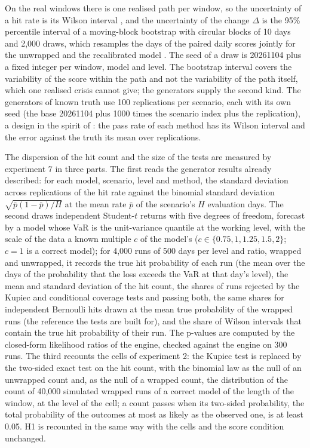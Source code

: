 On the real windows there is one realised path per window, so the uncertainty of a hit rate is its Wilson interval \citep{brown2001,wilson1927}, and the uncertainty of the change $\Delta$ is the 95\% percentile interval of a moving-block bootstrap with circular blocks of 10 days and 2,000 draws, which resamples the days of the paired daily scores jointly for the unwrapped and the recalibrated model \citep{kunsch1989,politis1994}. The seed of a draw is 20261104 plus a fixed integer per window, model and level. The bootstrap interval covers the variability of the score within the path and not the variability of the path itself, which one realised crisis cannot give; the generators supply the second kind. The generators of known truth use 100 replications per scenario, each with its own seed (the base 20261104 plus 1000 times the scenario index plus the replication), a design in the spirit of \citet{morris2019}: the pass rate of each method has its Wilson interval and the error against the truth its mean over replications.

The dispersion of the hit count and the size of the tests are measured by experiment 7 in three parts. The first reads the generator results already described: for each model, scenario, level and method, the standard deviation across replications of the hit rate against the binomial standard deviation $\sqrt{\bar p(1-\bar p)/H}$ at the mean rate $\bar p$ of the scenario's $H$ evaluation days. The second draws independent Student-$t$ returns with five degrees of freedom, forecast by a model whose VaR is the unit-variance quantile at the working level, with the scale of the data a known multiple $c$ of the model's ($c \in \{0.75, 1, 1.25, 1.5, 2\}$; $c = 1$ is a correct model); for 4,000 runs of 500 days per level and ratio, wrapped and unwrapped, it records the true hit probability of each run (the mean over the days of the probability that the loss exceeds the VaR at that day's level), the mean and standard deviation of the hit count, the shares of runs rejected by the Kupiec and conditional coverage tests and passing both, the same shares for independent Bernoulli hits drawn at the mean true probability of the wrapped runs (the reference the tests are built for), and the share of Wilson intervals that contain the true hit probability of their run. The p-values are computed by the closed-form likelihood ratios of the engine, checked against the engine on 300 runs. The third recounts the cells of experiment 2: the Kupiec test is replaced by the two-sided exact test on the hit count, with the binomial law as the null of an unwrapped count and, as the null of a wrapped count, the distribution of the count of 40,000 simulated wrapped runs of a correct model of the length of the window, at the level of the cell; a count passes when its two-sided probability, the total probability of the outcomes at most as likely as the observed one, is at least 0.05. H1 is recounted in the same way with the cells and the score condition unchanged.

